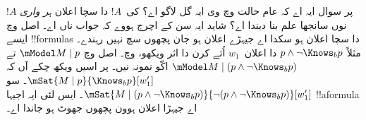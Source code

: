 \documentclass[../../../include/open-logic-section]{subfiles}
\begin{document}
پر سوال ایہ اے کہ عام حالت وچ وی ایہ گل لاگو اے؟ کی~$!A$ دا سچا
اعلان \emph{ہر واری} $!A$ نوں سانجھا علم بنا دیندا اے؟ شاید ایہ سن
کے اچرج ہووے کہ جواب ناں اے۔ اصل وچ ایسے !!{formula}s دا سچا اعلان
ہو سکدا اے جیہڑے اعلان ہو جان پچھوں سچ نہیں رہندے۔ مثلاً
$p \land \lnot \Knows_b p$ دا اعلان~$w_1$ اُتے کرن دا اثر ویکھو،
 وچ۔ اصل وچ $\mModel M \mid p$ تے
$\mModel M \mid (p \land \lnot \Knows_b p)$ اکّو نمونہ نیں۔
پر اسیں ویکھ چکے آں کہ $\mSat{M \mid p}{\Knows_b
p}[w'_1]$۔ سو $\mSat{M \mid (p \land \lnot \Knows_b p)}{\lnot
(p \land \lnot \Knows_b p)}[w'_1]$۔ ایس لئی ایہ اجیہا !!a{formula}
اے جیہڑا اعلان ہوون پچھوں جھوٹ ہو جاندا اے۔
\end{document}
